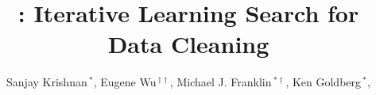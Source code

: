 \documentclass{sig-alternate}
\begin{document}
\newcommand{\reminder}[1]{{{\textcolor{magenta}{\{\{\bf #1\}\}}}\xspace}}
\newcommand{\ewu}[1]{{{\textcolor{blue}{\{\{\bf ewu:\} #1\}}}\xspace}}
\newcommand{\mps}[1]{{{\textcolor{red}{\{\{\bf meelap:\} #1\}}}\xspace}}
\newcommand{\stitle}[1]{\vspace{0.5em}\noindent\textbf{#1}}



\newcommand{\white}[1]{{\textcolor{white}{#1}\xspace}}
\newcommand{\blue}[1]{{\textcolor{blue}{{\bf #1}}\xspace}}
\newcommand{\orange}[1]{{\textcolor{orange}{{\bf #1}}\xspace}}
\newcommand{\pop}[1]{{\textcolor{pop}{{\textit{\textbf{#1}}}}\xspace}}
\newcommand{\red}[1]{\textcolor{red}{#1}}
\newcommand{\green}[1]{\textcolor{green}{#1}}
\newcommand{\gray}[1]{\textcolor{light-gray}{#1}}




\newcommand{\specialcell}[2][c]{%
  \begin{tabular}[#1]{@{}c@{}}#2\end{tabular}}

\def\ojoin{\setbox0=\hbox{$\bowtie$}%
  \rule[-.02ex]{.25em}{.4pt}\llap{\rule[\ht0]{.25em}{.4pt}}}
\def\leftouterjoin{\mathbin{\ojoin\mkern-5.8mu\bowtie}}
\def\rightouterjoin{\mathbin{\bowtie\mkern-5.8mu\ojoin}}
\def\fullouterjoin{\mathbin{\ojoin\mkern-5.8mu\bowtie\mkern-5.8mu\ojoin}}


\pagestyle{plain}

%

\title{\sys: Iterative Learning Search for Data Cleaning}


\author{ Sanjay Krishnan$\,^{*}$, Eugene Wu{$\,^{\dag\dag}$}, Michael J. Franklin$\,^{*\dag}$, Ken Goldberg$\,^{*}$,  \\
 \\
\\
\affaddr{}
}

\end{document}
